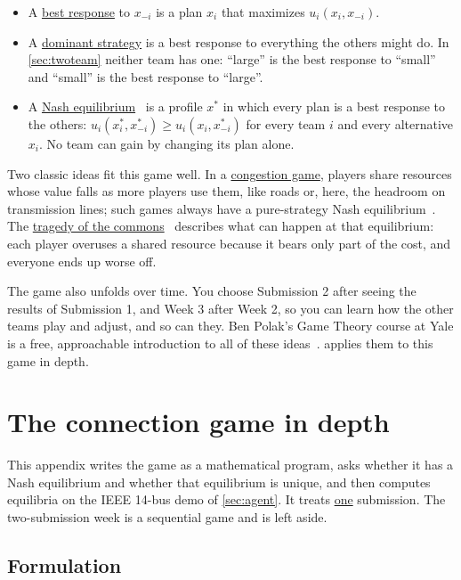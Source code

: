 \documentclass[10pt]{article}
\newcommand{\alert}[1]{{\color{alertblue}\uline{#1}}}
\begin{document}
\begin{itemize}[leftmargin=*]
  \item A \alert{best response} to $x_{-i}$ is a plan $x_i$ that maximizes
    $u_i(x_i, x_{-i})$.
  \item A \alert{dominant strategy} is a best response to everything the
    others might do. In \cref{sec:twoteam} neither team has one: ``large'' is
    the best response to ``small'' and ``small'' is the best response to
    ``large''.
  \item A \alert{Nash equilibrium}~\cite{nash1950equilibrium} is a profile
    $x^*$ in which every plan is a best response to the others:
    $u_i(x_i^*, x_{-i}^*) \ge u_i(x_i, x_{-i}^*)$ for every team $i$ and every
    alternative $x_i$. No team can gain by changing its plan alone.
\end{itemize}

Two classic ideas fit this game well. In a \alert{congestion game}, players
share resources whose value falls as more players use them, like roads or, here,
the headroom on transmission lines; such games always have a pure-strategy Nash
equilibrium~\cite{rosenthal1973class}. The \alert{tragedy of the
commons}~\cite{hardin1968tragedy} describes what can happen at that
equilibrium: each player overuses a shared resource because it bears only part
of the cost, and everyone ends up worse off.

The game also unfolds over time. You choose Submission 2 after seeing the
results of Submission 1, and Week 3 after Week 2, so you can learn how the other
teams play and adjust, and so can they. Ben Polak's Game Theory course at Yale
is a free, approachable introduction to all of these
ideas~\cite{polak2007gametheory}.  applies them to this
game in depth.

\section{The connection game in depth}\label{app:equilibrium}

This appendix writes the game as a mathematical program, asks whether it has a
Nash equilibrium and whether that equilibrium is unique, and then computes
equilibria on the IEEE 14-bus demo of \cref{sec:agent}. It treats \alert{one}
submission. The two-submission week is a sequential game and is left aside.

\subsection{Formulation}
\end{document}
